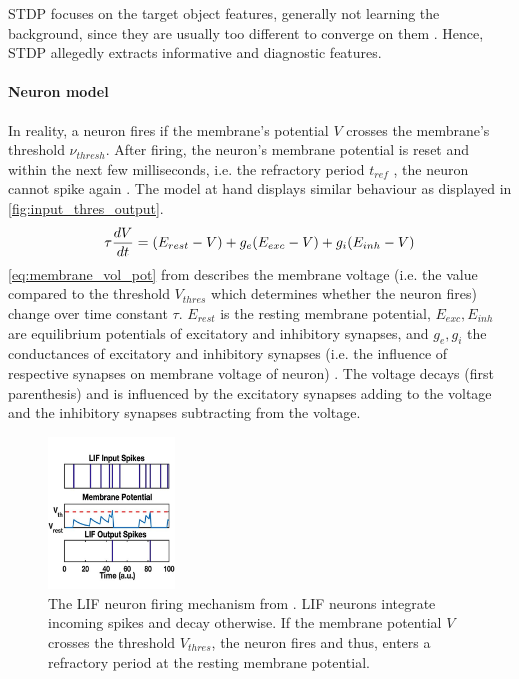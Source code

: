 \ac{STDP} focuses on the target object features, generally not learning the background, since they are usually too different to converge on them \cite{multi_scale_STDP,STDP_vis_feat}.
Hence, \ac{STDP} allegedly extracts informative and diagnostic features.


\paragraph{\textbf{Neuron model}}
In reality, a neuron fires if the membrane's potential $V$ crosses the membrane's threshold $\nu_{thresh}$.
After firing, the neuron's membrane potential is reset and within the next few milliseconds, i.e. the refractory period $t_{ref}$ \cite{RBM_SNN}, 
the neuron cannot spike again \cite{SNN}.
The model at hand displays similar behaviour as displayed in \autoref{fig:input_thres_output}.
%
\begin{equation}
    \centering
    \label{eq:membrane_vol_pot}
    \tau \frac{dV}{dt} = (E_{rest} - V) + g_e(E_{exc} - V) + g_i(E_{inh} - V)
\end{equation}
%
\autoref{eq:membrane_vol_pot} from \cite{SNN} describes the membrane voltage 
(i.e. the value compared to the threshold $V_{thres}$ which determines whether the neuron fires) change over time constant $\tau$.
$E_{rest}$ is the resting membrane potential, $E_{exc}, E_{inh}$ are equilibrium potentials of excitatory and inhibitory synapses, 
and $g_e, g_i$ the conductances of excitatory and inhibitory synapses (i.e. the influence of respective synapses on membrane voltage of neuron) \cite{SNN}. 
The voltage decays (first parenthesis) and is influenced by the excitatory synapses 
adding to the voltage and the inhibitory synapses subtracting from the voltage.
%
\begin{figure}[htbp]
    \center
    \includegraphics[width=0.3\textwidth]{pictures/input_pot_thres_output_altered.jpg}
    \caption{The \ac{LIF} neuron firing mechanism from \cite{input_thres_output}.
    \ac{LIF} neurons integrate incoming spikes and decay otherwise.
    If the membrane potential $V$ crosses the threshold $V_{thres}$, the neuron fires and thus, 
    enters a refractory period at the resting membrane potential.}
    \label{fig:input_thres_output}
\end{figure}


